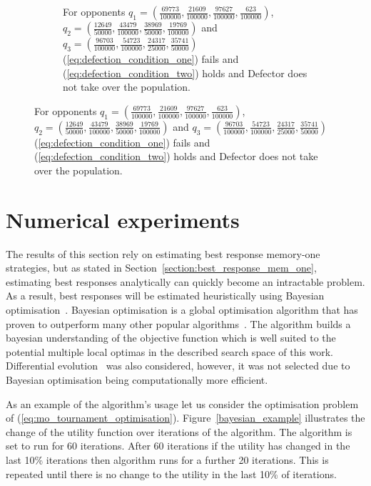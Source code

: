 \documentclass[10pt]{article}
\begin{document}
\begin{figure}[!htb]
\begin{subfigure}{0.49\textwidth}
        \caption{For opponents $q_{1}=(\frac{69773}{100000},\frac{21609}{100000},\frac{97627}{100000},\frac{623}{100000})$,
        $q_{2}=(\frac{12649}{50000},\frac{43479}{100000},\frac{38969}{50000},\frac{19769}{100000})$ and
        $q_{3}=(\frac{96703}{100000},\frac{54723}{100000},\frac{24317}{25000},\frac{35741}{50000})$
        (\ref{eq:defection_condition_one}) fails and
        (\ref{eq:defection_condition_two}) holds and Defector does not take over
        the population.}
        \label{fig:unstable_defection}
    \end{subfigure}
\end{figure}

\section{Numerical experiments} \label{section:numerical_experiments}

The results of this section rely on estimating best response memory-one strategies, but as stated in
Section~\ref{section:best_response_mem_one}, estimating best responses
analytically can quickly become an intractable problem. As a result, best
responses will be estimated heuristically using Bayesian
optimisation~\cite{Mokus1978}. Bayesian optimisation is a global optimisation
algorithm that has proven to outperform many other popular
algorithms~\cite{Jones2001}. The algorithm builds a bayesian understanding of
the objective function which is well suited to the potential multiple local optimas in
the described search space of this work. Differential evolution~\cite{Storn1997}
was also considered, however, it was not selected due to Bayesian optimisation being
computationally more efficient.

As an example of the algorithm's usage let us consider the optimisation problem
of (\ref{eq:mo_tournament_optimisation}). Figure~\ref{bayesian_example}
illustrates the change of the utility function over iterations of the algorithm.
The algorithm is set to run for 60 iterations. After 60 iterations if the
utility has changed in the last 10\% iterations then algorithm runs for a
further 20 iterations. This is repeated until there is no change to the utility
in the last 10\% of iterations.
\end{document}
